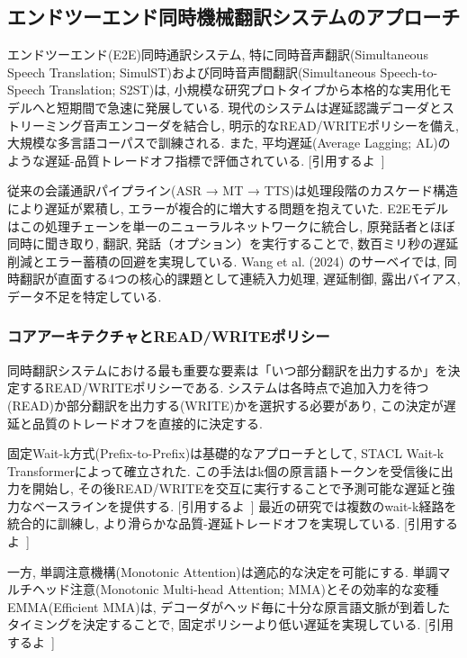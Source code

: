 \subsection{エンドツーエンド同時機械翻訳システムのアプローチ}

エンドツーエンド(E2E)同時通訳システム, 特に同時音声翻訳(Simultaneous Speech Translation; SimulST)および同時音声間翻訳(Simultaneous Speech-to-Speech Translation; S2ST)は, 小規模な研究プロトタイプから本格的な実用化モデルへと短期間で急速に発展している.
現代のシステムは遅延認識デコーダとストリーミング音声エンコーダを結合し, 明示的なREAD/WRITEポリシーを備え, 大規模な多言語コーパスで訓練される.
また, 平均遅延(Average Lagging; AL)のような遅延-品質トレードオフ指標で評価されている.
[引用するよ~]

従来の会議通訳パイプライン(ASR → MT → TTS)は処理段階のカスケード構造により遅延が累積し, エラーが複合的に増大する問題を抱えていた.
E2Eモデルはこの処理チェーンを単一のニューラルネットワークに統合し, 原発話者とほぼ同時に聞き取り, 翻訳, 発話（オプション）を実行することで, 数百ミリ秒の遅延削減とエラー蓄積の回避を実現している.
Wang et al. (2024) \cite{wang2024recent}のサーベイでは, 同時翻訳が直面する4つの核心的課題として連続入力処理, 遅延制御, 露出バイアス, データ不足を特定している.

\subsubsection{コアアーキテクチャとREAD/WRITEポリシー}

同時翻訳システムにおける最も重要な要素は「いつ部分翻訳を出力するか」を決定するREAD/WRITEポリシーである.
システムは各時点で追加入力を待つ(READ)か部分翻訳を出力する(WRITE)かを選択する必要があり, この決定が遅延と品質のトレードオフを直接的に決定する.

固定Wait-k方式(Prefix-to-Prefix)は基礎的なアプローチとして, STACL Wait-k Transformerによって確立された.
この手法はk個の原言語トークンを受信後に出力を開始し, その後READ/WRITEを交互に実行することで予測可能な遅延と強力なベースラインを提供する.
[引用するよ~]
最近の研究では複数のwait-k経路を統合的に訓練し, より滑らかな品質-遅延トレードオフを実現している.
[引用するよ~]

一方, 単調注意機構(Monotonic Attention)は適応的な決定を可能にする.
単調マルチヘッド注意(Monotonic Multi-head Attention; MMA)とその効率的な変種EMMA(Efficient MMA)は, デコーダがヘッド毎に十分な原言語文脈が到着したタイミングを決定することで, 固定ポリシーより低い遅延を実現している.
[引用するよ~]

